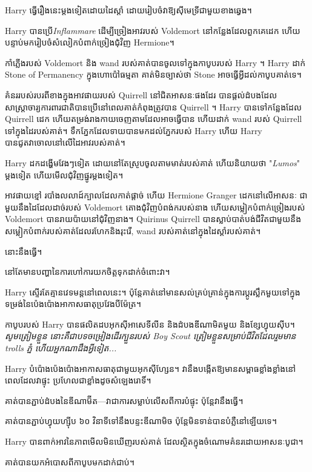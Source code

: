 {Harry ធ្វើរឿងនេះម្តងទៀតដោយដៃស្តាំ ដោយរៀបចំវាឱ្យស៊ីមេទ្រីជាមួយខាងឆ្វេង។

Harry បានប្រើ\emph{Inflammare} ដើម្បីច្រៀងអាវរបស់ Voldemort នៅកន្លែងដែលពួកគេដេក ហើយបន្ទាប់មករៀបចំសំលៀកបំពាក់ច្រៀងជុំវិញ Hermione។

កាំភ្លើងរបស់ Voldemort និង wand របស់គាត់បានចូលទៅក្នុងកាបូបរបស់ Harry ។ Harry ដាក់ Stone of Permanency ក្នុង​ហោប៉ៅ​ធម្មតា គាត់​មិន​ច្បាស់​ថា Stone អាច​ធ្វើ​អ្វី​ដល់​កាបូប​គាត់​ទេ។

គំនររបស់របរពីខាងក្នុងអាវផាយរបស់ Quirrell នៅជិតអាសនៈផងដែរ បានផ្តល់ដំបងដែលសាស្ត្រាចារ្យការពារជាតិបានប្រើនៅពេលគាត់កំពុងត្រូវបាន Quirrell ។ Harry បានទៅកន្លែងដែល Quirrell ដេក ហើយតម្រង់រាងកាយចេញតាមដែលអាចធ្វើបាន ហើយដាក់ wand របស់ Quirrell ទៅក្នុងដៃរបស់គាត់។ ទឹកភ្នែកដែលទាយបានមកដល់ភ្នែករបស់ Harry ហើយ Harry បានជូតវាចោលនៅលើដៃអាវរបស់គាត់។

Harry ដកដង្ហើមវែងៗទៀត ដោយនៅតែស្រូបចូលតាមមាត់របស់គាត់ ហើយនិយាយថា "\emph{Lumos}" ម្តងទៀត ហើយមើលជុំវិញផ្នូរម្តងទៀត។

អាវផាយខ្មៅ របាំងលលាដ៍ក្បាលដែលកាត់ផ្តាច់ ហើយ Hermione Granger ដេកនៅលើអាសនៈ ជាមួយនឹងដៃដែលដាច់របស់ Voldemort តោងជុំវិញបំពង់ករបស់នាង ហើយសម្លៀកបំពាក់ច្រៀងរបស់ Voldemort បានរាយប៉ាយនៅជុំវិញនាង។ Quirinus Quirrell បានស្លាប់បាត់បង់ជីវិតជាមួយនឹងសម្លៀកបំពាក់របស់គាត់ដែលរហែកនិងរុះរើ, wand របស់គាត់នៅក្នុងដៃស្តាំរបស់គាត់។

នោះនឹងធ្វើ។

នៅតែមានបញ្ហានៃការហៅការយកចិត្តទុកដាក់ចំពោះវា។

Harry ស្ទើរតែគ្មានវេទមន្តនៅពេលនេះ។ ប៉ុន្តែ​គាត់​នៅ​មាន​សល់​គ្រប់គ្រាន់​ក្នុង​ការ​ប្តូរ​ស្លឹក​មួយ​ទៅ​ក្នុង​ទម្រង់​នៃ​ប៉េងប៉ោង​អាកាសធាតុ​ប្រវែង​បី​ម៉ែត្រ។

កាបូបរបស់ Harry បានផលិតដបអុកស៊ីអាសេទីលីន និងដំបងឌីណាមិតមួយ និងខ្សែហ្វុយស៊ីប។ \emph{សូមត្រៀមខ្លួន នោះគឺជាបទចម្រៀងដើរក្បួនរបស់ Boy Scout ត្រៀមខ្លួនសម្រាប់ជីវិតដែលរួមមាន trolls ភ្នំ ហើយអ្នកណាដឹងអ្វីទៀត...}

Harry បំប៉ោង​ប៉េងប៉ោង​អាកាសធាតុ​ជាមួយ​អុកស៊ីហ្សែន។ វានឹងបង្កើតឱ្យមានសម្ពាធខ្លាំងខ្លាំងនៅពេលដែលវាផ្ទុះ ប្រហែលជាខ្លាំងដូចសំឡេងរោទិ៍។

គាត់​បាន​ភ្ជាប់​ដំបង​នៃ​ឌីណាម៊ីត—វា​ជា​ការ​សម្លាប់​លើស​ពី​ការ​បំផ្ទុះ ប៉ុន្តែ​វា​នឹង​ធ្វើ។

គាត់​បាន​ភ្ជាប់​ហ្វុយហ្ស៊ីប ៦០ វិនាទី​ទៅ​នឹង​បន្ទះ​ឌីណាមិច ប៉ុន្តែ​មិន​ទាន់​បាន​បំភ្លឺ​នៅ​ឡើយ​ទេ។

Harry បាន​ពាក់​អាវ​នៃ​ភាព​មើល​មិន​ឃើញ​របស់​គាត់ ដែល​ស្ថិត​ក្នុង​ចំណោម​គំនរ​ដោយ​អាសនៈ​បូជា។

គាត់​បាន​យក​អំបោស​ពី​កាបូប​មក​ដាក់​ជាប់។

}
